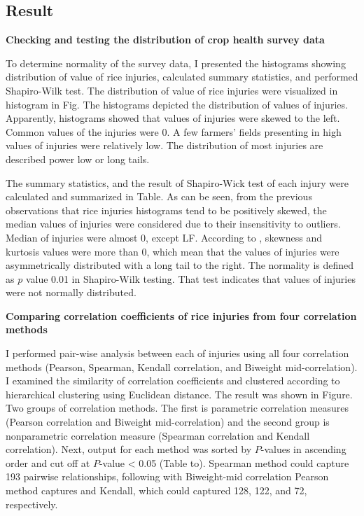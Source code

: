 \subsection*{Result}

\textbf{Checking and testing the distribution of crop health survey data}

To determine normality of the survey data, I presented the histograms showing distribution of value of rice injuries, calculated summary statistics, and performed Shapiro-Wilk test. The distribution of value of rice injuries were visualized in histogram in Fig. The histograms depicted the distribution of values of injuries. Apparently, histograms showed that values of injuries were skewed to the left. Common values of the injuries were 0. A few farmers’ fields presenting in high values of injuries were relatively low. The distribution of most injuries are described power low or long tails. 

The summary statistics, and the result of Shapiro-Wick test of each injury were calculated and summarized in Table.  As can be seen, from the previous observations that rice injuries histograms tend to be positively skewed, the median values of injuries were considered due to their insensitivity to outliers. Median of injuries were almost 0, except LF. According to \citet{Doane_2011_Measuring}, skewness and kurtosis values were more than 0, which mean that the values of injuries were asymmetrically distributed with a long tail to the right. The normality is defined as $p$ value 0.01 in Shapiro-Wilk testing. That test indicates that values of injuries were not normally distributed.

\textbf{Comparing correlation coefficients of rice injuries from four correlation methods }

I performed pair-wise analysis between each of injuries using all four correlation methods (Pearson, Spearman, Kendall correlation, and Biweight mid-correlation). I examined the similarity of correlation coefficients and clustered according to hierarchical clustering using Euclidean distance. The result was shown in Figure. Two groups of correlation methods. The first is parametric correlation measures (Pearson correlation and Biweight mid-correlation) and the second group is nonparametric correlation measure (Spearman correlation and Kendall correlation). Next, output for each method was sorted by $P$-values in ascending order and cut off at $P$-value < 0.05 (Table to).  Spearman method could capture 193 pairwise relationships, following with Biweight-mid correlation Pearson method captures and Kendall, which could captured 128, 122, and 72, respectively.

